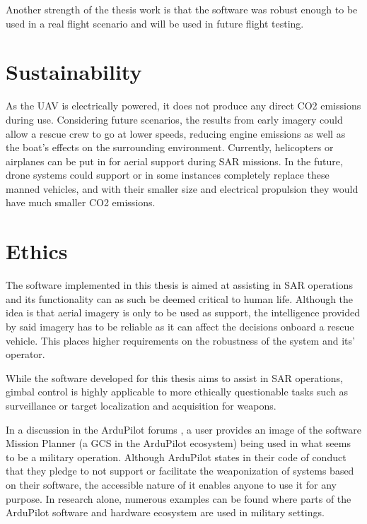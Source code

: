 \documentclass[nofilelist]{cslthse-msc}
\begin{document}
Another strength of the thesis work is that the software was robust enough to be used in a real flight scenario and will be used in future flight testing.

\section{Sustainability}
As the UAV is electrically powered, it does not produce any direct CO2 emissions during use. Considering future scenarios, the results from early imagery could allow a rescue crew to go at lower speeds, reducing engine emissions as well as the boat's effects on the surrounding environment. Currently, helicopters or airplanes can be put in for aerial support during SAR missions. In the future, drone systems could support or in some instances completely replace these manned vehicles, and with their smaller size and electrical propulsion they would have much smaller CO2 emissions.

\section{Ethics}
The software implemented in this thesis is aimed at assisting in SAR operations and its functionality can as such be deemed critical to human life. Although the idea is that aerial imagery is only to be used as support, the intelligence provided by said imagery has to be reliable as it can affect the decisions onboard a rescue vehicle. This places higher requirements on the robustness of the system and its' operator. 

While the software developed for this thesis aims to assist in SAR operations, gimbal control is highly applicable to more ethically questionable tasks such as surveillance or target localization and acquisition for weapons. 

In a discussion in the ArduPilot forums \cite{ardupilot-military-discussion}, a user provides an image of the software Mission Planner (a GCS in the ArduPilot ecosystem) being used in what seems to be a military operation. Although ArduPilot states in their code of conduct \cite{ardupilot-coc} that they pledge to not support or facilitate the weaponization of systems based on their software, the accessible nature of it enables anyone to use it for any purpose. In research alone, numerous examples can be found \cite{ardupilot-military} \cite{ardupilot-military-1} where parts of the ArduPilot software and hardware ecosystem are used in military settings.
\end{document}
